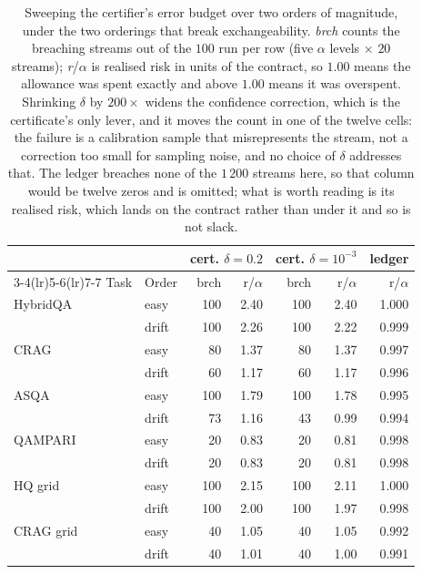 \begin{table}[t]
\centering
\caption{Sweeping the certifier's error budget over two orders of magnitude, under the two orderings that break exchangeability. \emph{brch} counts the breaching streams out of the $100$ run per row (five $\alpha$ levels $\times$ $20$ streams); \emph{r}/$\alpha$ is realised risk in units of the contract, so $1.00$ means the allowance was spent exactly and above $1.00$ means it was overspent. Shrinking $\delta$ by $200\times$ widens the confidence correction, which is the certificate's only lever, and it moves the count in one of the twelve cells: the failure is a calibration sample that misrepresents the stream, not a correction too small for sampling noise, and no choice of $\delta$ addresses that. The ledger breaches none of the $1\,200$ streams here, so that column would be twelve zeros and is omitted; what is worth reading is its realised risk, which lands on the contract rather than under it and so is not slack.}
\label{tab:delta}
\footnotesize
\setlength{\tabcolsep}{3.2pt}
\begin{tabular}{llrrrrr}
\toprule
 & & \multicolumn{2}{c}{cert. $\delta=0.2$} & \multicolumn{2}{c}{cert. $\delta=10^{-3}$} & ledger \\
\cmidrule(lr){3-4}\cmidrule(lr){5-6}\cmidrule(lr){7-7}
Task & Order & brch & r/$\alpha$ & brch & r/$\alpha$ & r/$\alpha$ \\
\midrule
HybridQA & easy & 100 & 2.40 & 100 & 2.40 & 1.000 \\
 & drift & 100 & 2.26 & 100 & 2.22 & 0.999 \\
\addlinespace[2pt]
CRAG & easy & 80 & 1.37 & 80 & 1.37 & 0.997 \\
 & drift & 60 & 1.17 & 60 & 1.17 & 0.996 \\
\addlinespace[2pt]
ASQA & easy & 100 & 1.79 & 100 & 1.78 & 0.995 \\
 & drift & 73 & 1.16 & 43 & 0.99 & 0.994 \\
\addlinespace[2pt]
QAMPARI & easy & 20 & 0.83 & 20 & 0.81 & 0.998 \\
 & drift & 20 & 0.83 & 20 & 0.81 & 0.998 \\
\addlinespace[2pt]
HQ grid & easy & 100 & 2.15 & 100 & 2.11 & 1.000 \\
 & drift & 100 & 2.00 & 100 & 1.97 & 0.998 \\
\addlinespace[2pt]
CRAG grid & easy & 40 & 1.05 & 40 & 1.05 & 0.992 \\
 & drift & 40 & 1.01 & 40 & 1.00 & 0.991 \\
\bottomrule
\end{tabular}
\end{table}
